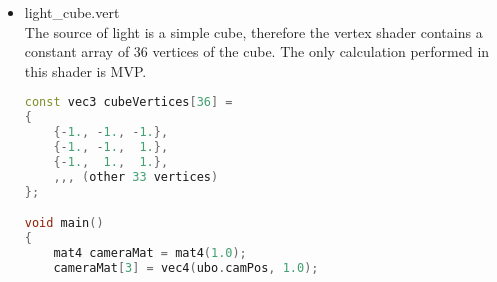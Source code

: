 \begin{itemize}
\begin{lstlisting}[language=c++, caption=Grid fragment shader (./assets/shaders/grid.frag)]
float log10(float x)
{
    return log(x) / log(10.0);
}

float satf(float x)
{
    return clamp(x, 0.0, 1.0);
}

vec2 satv(vec2 x)
{
    return clamp(x, vec2(0.0), vec2(1.0));
}

float max2(vec2 v)
{
    return max(v.x, v.y);
}

vec4 gridColor(vec2 uv, vec2 camPos)
{
    vec2 dudv = vec2(
        length(vec2(dFdx(uv.x), dFdy(uv.x))),
        length(vec2(dFdx(uv.y), dFdy(uv.y)))
    );

    float lodLevel = max(0.0, log10((length(dudv) * gridMinPixelsBetweenCells) / gridCellSize) + 1.0);
    float lodFade = fract(lodLevel);

    float lod0 = gridCellSize * pow(10.0, floor(lodLevel));
    float lod1 = lod0 * 10.0;
    float lod2 = lod1 * 10.0;

    dudv *= 4.0;

    float lod0a = max2(vec2(1.0) - abs(satv(mod(uv, lod0) / dudv) * 2.0 - vec2(1.0)));
    float lod1a = max2(vec2(1.0) - abs(satv(mod(uv, lod1) / dudv) * 2.0 - vec2(1.0)));
    float lod2a = max2(vec2(1.0) - abs(satv(mod(uv, lod2) / dudv) * 2.0 - vec2(1.0)));

    uv -= camPos;

    vec4 c = lod2a > 0.0 ? gridColorThick : lod1a > 0.0 ? mix(gridColorThick, gridColorThin, lodFade) : gridColorThin;

    float opacityFalloff = (1.0 - satf(length(uv) / gridSize));

    c.a *= (lod2a > 0.0 ? lod2a : lod1a > 0.0 ? lod1a : (lod0a * (1.0-lodFade))) * opacityFalloff;

    return c;
}

void main()
{
    outColor = gridColor(uv, camPos);
}
\end{lstlisting}
    \item light\_cube.vert\\
    The source of light is a simple cube, therefore the vertex shader contains a constant array of 36 vertices of the cube. The only calculation performed in this shader is MVP.
\begin{lstlisting}[language=c++, caption=Light cube vertex shader (./assets/shaders/light\_cube.vert)]
const vec3 cubeVertices[36] =
{
    {-1., -1., -1.},
    {-1., -1.,  1.},
    {-1.,  1.,  1.},
    ,,, (other 33 vertices)
};

void main()
{
    mat4 cameraMat = mat4(1.0);
    cameraMat[3] = vec4(ubo.camPos, 1.0);


\end{lstlisting}
\end{itemize}
